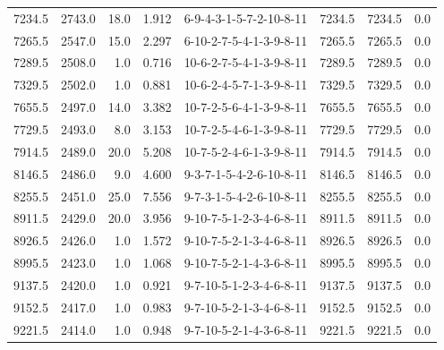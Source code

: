 \begin{tabular}{rrrrlrrr}
 7234.5 &  2743.0 &           18.0 &              1.912 &  6-9-4-3-1-5-7-2-10-8-11 &        7234.5 &          7234.5 &       0.0 \\
 7265.5 &  2547.0 &           15.0 &              2.297 &  6-10-2-7-5-4-1-3-9-8-11 &        7265.5 &          7265.5 &       0.0 \\
 7289.5 &  2508.0 &            1.0 &              0.716 &  10-6-2-7-5-4-1-3-9-8-11 &        7289.5 &          7289.5 &       0.0 \\
 7329.5 &  2502.0 &            1.0 &              0.881 &  10-6-2-4-5-7-1-3-9-8-11 &        7329.5 &          7329.5 &       0.0 \\
 7655.5 &  2497.0 &           14.0 &              3.382 &  10-7-2-5-6-4-1-3-9-8-11 &        7655.5 &          7655.5 &       0.0 \\
 7729.5 &  2493.0 &            8.0 &              3.153 &  10-7-2-5-4-6-1-3-9-8-11 &        7729.5 &          7729.5 &       0.0 \\
 7914.5 &  2489.0 &           20.0 &              5.208 &  10-7-5-2-4-6-1-3-9-8-11 &        7914.5 &          7914.5 &       0.0 \\
 8146.5 &  2486.0 &            9.0 &              4.600 &  9-3-7-1-5-4-2-6-10-8-11 &        8146.5 &          8146.5 &       0.0 \\
 8255.5 &  2451.0 &           25.0 &              7.556 &  9-7-3-1-5-4-2-6-10-8-11 &        8255.5 &          8255.5 &       0.0 \\
 8911.5 &  2429.0 &           20.0 &              3.956 &  9-10-7-5-1-2-3-4-6-8-11 &        8911.5 &          8911.5 &       0.0 \\
 8926.5 &  2426.0 &            1.0 &              1.572 &  9-10-7-5-2-1-3-4-6-8-11 &        8926.5 &          8926.5 &       0.0 \\
 8995.5 &  2423.0 &            1.0 &              1.068 &  9-10-7-5-2-1-4-3-6-8-11 &        8995.5 &          8995.5 &       0.0 \\
 9137.5 &  2420.0 &            1.0 &              0.921 &  9-7-10-5-1-2-3-4-6-8-11 &        9137.5 &          9137.5 &       0.0 \\
 9152.5 &  2417.0 &            1.0 &              0.983 &  9-7-10-5-2-1-3-4-6-8-11 &        9152.5 &          9152.5 &       0.0 \\
 9221.5 &  2414.0 &            1.0 &              0.948 &  9-7-10-5-2-1-4-3-6-8-11 &        9221.5 &          9221.5 &       0.0 \\
\bottomrule
\end{tabular}
